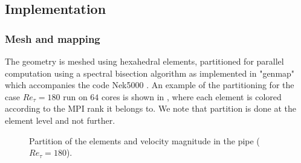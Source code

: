 \documentclass{sig-alternate}
\begin{document}

\subsection{Implementation}
\label{sec:implementation}

\subsubsection{Mesh and mapping}
\label{sec:code}
The geometry is meshed using hexahedral elements, partitioned for parallel
computation using a spectral bisection algorithm as implemented in "genmap"
which accompanies the code Nek5000 \cite{argonne:nekdoc}. An example of the
partitioning for the case $Re_{\tau} = 180$ run on $64$ cores is shown in , where each element is colored according to the MPI rank it belongs to. We note that partition is done at the element level and not further.
\begin{figure}
  \centering
  \caption{Partition of the elements and velocity magnitude in the pipe ($Re_{\tau}=180$).}
  \label{fig:partition}
\end{figure}
 
\end{document}
